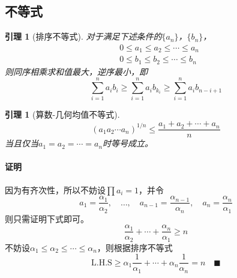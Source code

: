 \documentclass[12pt, a4paper]{article}
\theoremstyle{margin}
\newtheorem{lemma}[thm]{引理}
\newcommand{\lhs}{\text{L.H.S}}
\newcommand{\proof}{\paragraph{证明}}
\begin{document}
\subsection{不等式}

  \begin{lemma}[排序不等式]
    \label{lemma: 排序不等式}
    对于满足下述条件的$\{a_n\}$，$\{b_n\}$，
    \[\begin{split}
      & 0 \le a_1\le a_2\le\cdots\le a_n \\
      & 0 \le b_1\le b_2\le\cdots\le b_n
    \end{split}\]
    则同序相乘求和值最大，逆序最小，即
    \[
      \sum_{i=1}^n a_ib_i \ge \sum_{i=1}^n a_ib_{k_i}
      \ge \sum_{i=1}^n a_ib_{n-i+1}
    \]
  \end{lemma}

  \begin{lemma}[算数-几何均值不等式]
    \[
      (a_1a_2\cdots a_n)^{1/n} \le \frac{a_1+a_2+\cdots+a_n}{n}
    \]
    当且仅当$a_1 = a_2 = \cdots = a_n$时等号成立。
  \end{lemma}
  \proof
    因为有齐次性，所以不妨设$\prod a_i=1$，并令
    \[
      a_1=\frac{\alpha_1}{\alpha_2},\quad
      \dots,\quad
      a_{n-1} = \frac{\alpha_{n-1}}{\alpha_n},\quad
      a_n = \frac{\alpha_n}{\alpha_1}
    \]
    则只需证明下式即可。
    \[
      \frac{\alpha_1}{\alpha_2} + \cdots + \frac{\alpha_n}{\alpha_1}
      \ge n
    \]
    不妨设$\alpha_1 \le \alpha_2 \le \cdots \le \alpha_n$，则根据排序不等式
    \[
      \lhs \ge \alpha_1\frac{1}{\alpha_1} + \cdots + \alpha_n\frac{1}{\alpha_n}
       = n \quad\blacksquare
    \]
\end{document}
